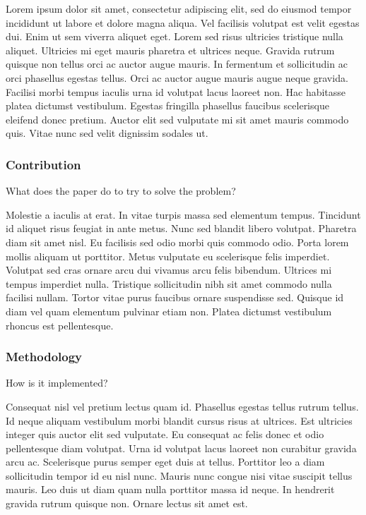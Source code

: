 \vskip 1cm

Lorem ipsum dolor sit amet, consectetur adipiscing elit, sed do eiusmod tempor incididunt ut labore et dolore magna aliqua. Vel facilisis volutpat est velit egestas dui. Enim ut sem viverra aliquet eget. Lorem sed risus ultricies tristique nulla aliquet. Ultricies mi eget mauris pharetra et ultrices neque. Gravida rutrum quisque non tellus orci ac auctor augue mauris. In fermentum et sollicitudin ac orci phasellus egestas tellus. Orci ac auctor augue mauris augue neque gravida. Facilisi morbi tempus iaculis urna id volutpat lacus laoreet non. Hac habitasse platea dictumst vestibulum. Egestas fringilla phasellus faucibus scelerisque eleifend donec pretium. Auctor elit sed vulputate mi sit amet mauris commodo quis. Vitae nunc sed velit dignissim sodales ut.



\subsubsection*{Contribution}

What does the paper do to try to solve the problem?

\vskip 1cm

Molestie a iaculis at erat. In vitae turpis massa sed elementum tempus. Tincidunt id aliquet risus feugiat in ante metus. Nunc sed blandit libero volutpat. Pharetra diam sit amet nisl. Eu facilisis sed odio morbi quis commodo odio. Porta lorem mollis aliquam ut porttitor. Metus vulputate eu scelerisque felis imperdiet. Volutpat sed cras ornare arcu dui vivamus arcu felis bibendum. Ultrices mi tempus imperdiet nulla. Tristique sollicitudin nibh sit amet commodo nulla facilisi nullam. Tortor vitae purus faucibus ornare suspendisse sed. Quisque id diam vel quam elementum pulvinar etiam non. Platea dictumst vestibulum rhoncus est pellentesque.


\subsubsection*{Methodology}

How is it implemented?

\vskip 1cm

Consequat nisl vel pretium lectus quam id. Phasellus egestas tellus rutrum tellus. Id neque aliquam vestibulum morbi blandit cursus risus at ultrices. Est ultricies integer quis auctor elit sed vulputate. Eu consequat ac felis donec et odio pellentesque diam volutpat. Urna id volutpat lacus laoreet non curabitur gravida arcu ac. Scelerisque purus semper eget duis at tellus. Porttitor leo a diam sollicitudin tempor id eu nisl nunc. Mauris nunc congue nisi vitae suscipit tellus mauris. Leo duis ut diam quam nulla porttitor massa id neque. In hendrerit gravida rutrum quisque non. Ornare lectus sit amet est.



